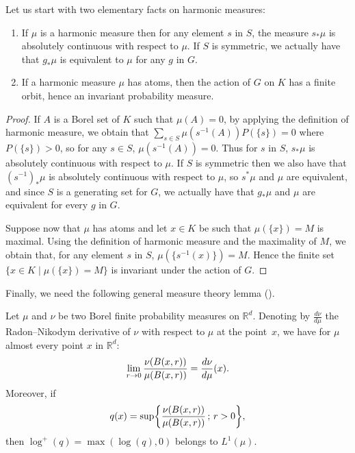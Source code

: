 \documentclass[AHL,Unicode,longabstracts,published]{cedram}
\newcommand{\R}{\mathbb{R}}
\renewcommand*{\to}{\mathchoice{\longrightarrow}{\rightarrow}{\rightarrow}{\rightarrow}}
\let\originalleft\left
\let\originalright\right
\renewcommand{\left}{\mathopen{}\mathclose\bgroup\originalleft}
\renewcommand{\right}{\aftergroup\egroup\originalright}
\newcommand{\R}{\mathbb{R}}
\begin{document}
Let us start with two elementary facts on harmonic measures:

\begin{lemm}\leavevmode
\label{acatoms}
\begin{enumerate}
\item\label{lemm3.3.1} If $\mu$ is a harmonic measure then for any element $s$ in $S$, the measure $s_{*} \mu$ is absolutely continuous with respect to $\mu$. If $S$ is symmetric, we actually have that $g_*\mu$ is equivalent to $\mu$ for any $g$ in $G$.
\item\label{lemm3.3.2} If a harmonic measure $\mu$ has atoms, then the action of $G$ on $K$ has a finite orbit, hence an invariant probability measure.
\end{enumerate}
\end{lemm}

\begin{proof}
If $A$ is a Borel set of $K$ such that $\mu(A)=0$, by applying the definition of harmonic measure, we obtain that $\sum _{s \in S} \mu(s^{-1}(A))P(\{ s \})=0$ where $P(\{s\})>0$, so for any $s \in S$, $\mu(s^{-1}(A))=0$. Thus for $s$ in $S$, $s_*\mu$ is absolutely continuous with respect to $\mu$. If $S$ is symmetric then we also have that $(s^{-1})_*\mu$ is absolutely continuous with respect to $\mu$, so $s^*\mu$ and $\mu$ are equivalent, and since $S$ is a generating set for $G$, we actually have that $g_*\mu$ and $\mu$ are equivalent for every $g$ in $G$.

Suppose now that $\mu$ has atoms and let $x\in K$ be such that $\mu(\{ x \})=M$ is maximal. Using the definition of harmonic measure and the maximality of $M$, we obtain that, for any element $s$ in $S$, $\mu(\{ s^{-1}(x) \})=M$. Hence the finite set $\{ x \in K \mid \mu(\{ x \})=M \}$ is invariant under the action of $G$.
\end{proof}

Finally, we need the following general measure theory lemma (\cite[Proposition~5]{Led}).


\begin{lemm}\label{generaltheory}
Let $\mu$ and $\nu$ be two Borel finite probability measures on $\R^d$. Denoting by $\frac{d\nu}{d \mu}$ the Radon--Nikodym derivative of $\nu$ with respect to $\mu$ at the point~$x$, we have for $\mu$ almost every point $x$ in $\R^d$:
\[
\lim_{ r\to 0 } \frac{\nu(B(x,r))}{\mu(B(x,r))}=\frac{d\nu}{d \mu}(x).
\]
Moreover, if
\[
q(x)= \sup \left\{ \frac{\nu(B(x,r))}{\mu(B(x,r))} \,;\, r>0 \right\},
\]
then $\log^{+}(q)= \max(\log(q),0)$ belongs to $L^{1}(\mu)$.
\end{lemm}
\end{document}

